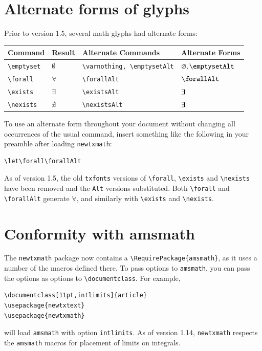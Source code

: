 \documentclass[11pt]{article}
\theoremstyle{oldplain}
\theoremstyle{plain}
\begin{document}
\section{Alternate forms of glyphs}
Prior to version 1.5, several math glyphs had alternate forms:
\begin{center}
  \begin{tabular}{@{} llll @{}}
    \hline
    Command & Result &  Alternate Commands & Alternate Forms\\ 
    \hline
    \verb|\emptyset| & $\emptyset$ & \verb|\varnothing, \emptysetAlt|& $\varnothing, \emptysetAlt$ \\ 
    \verb|\forall| & $\forall$ & \verb|\forallAlt| & $\forallAlt$ \\ 
    \verb|\exists| & $\exists$ & \verb|\existsAlt| & $\exists$ \\ 
    \verb|\nexists| & $\nexists$ & \verb|\nexistsAlt| & $\exists$ \\ 
    \hline
  \end{tabular}
\end{center}

To use an alternate form throughout your document without changing all occurrences of the usual command, insert something like the following in your preamble after loading \texttt{newtxmath}:
\begin{verbatim}
\let\forall\forallAlt
\end{verbatim}
As of version 1.5, the old {\tt txfonts} versions of \verb|\forall|, \verb|\exists| and \verb|\nexists| have been removed and the {\tt Alt} versions substituted. Both \verb|\forall| and \verb|\forallAlt| generate $\forall$, and similarly with \verb|\exists| and \verb|\nexists|.

\section{Conformity with amsmath}
The {\tt newtxmath} package now contains a \verb|\RequirePackage{amsmath}|, as it uses a number of the macros defined there. To pass options to {\tt amsmath}, you can pass the options as options to \verb|\documentclass|. For example,
\begin{verbatim}
\documentclass[11pt,intlimits]{article}
\usepackage{newtxtext}
\usepackage{newtxmath}
\end{verbatim}
will load {\tt amsmath} with option {\tt intlimits}. As of version 1.14, {\tt newtxmath} respects the {\tt amsmath} macros for placement of limits on integrals.
\end{document}
